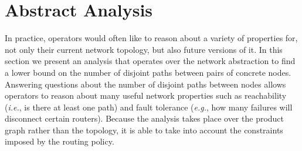 \documentclass[numbers, 10pt, preprint]{sigplanconf}
\newcommand{\EG}{\emph{e.g.}}
\newcommand{\IE}{\emph{i.e.}}
\begin{document}
%
%
%
%


\section{Abstract Analysis}
\label{sec:analysis}

In practice, operators would often like to reason about a variety of properties for, not only their current network topology, but also future versions of it.
In this section we present an analysis that operates over the network abstraction to find a lower bound on the number of disjoint paths between pairs of concrete nodes. Answering questions about the number of disjoint paths between nodes allows operators to reason about many useful network properties such as reachability (\IE, is there at least one path) and fault tolerance (\EG, how many failures will disconnect certain routers). Because the analysis takes place over the product graph rather than the topology, it is able to take into account the constraints imposed by the routing policy.


\newcommand{\inference}[7]{
    \node[draw, anchor=west] at (#1 + .5, 2.5 / 2) {#3};
    \node[] at (#1, 2.5 / 2 + 2.5) {\textbf{#5}};
    \node at (#1 + .34, .6 + .2) {#6};
    \node at (#1 + .34, 1.9 - .2) {#7};
    \node at (#1, -.6) {#2};
    \node at (#1, 2.5 + .4 + .2) {#4};
    \draw [] (#1, 2.5 - .2) circle [radius=0.4] node {$n$};
    \draw [] (#1, .2) circle [radius=0.4] node {$m$};
    \draw [->] (#1, .4 + .2) -- (#1, 2.5 - .4 - .2);
}

\newcommand{\inferencenobox}[7]{
    \node[anchor=west] at (#1 + .1, 1.25) {#3};
    \node[] at (#1, 2.5 / 2 + 2.5) {\textbf{#5}};
    \node at (#1 + .34, .6) {#6};
    \node at (#1 + .34, 1.9) {#7};
    \node at (#1, -.6) {#2};
    \node at (#1, 2.5 + .4 + .2) {#4};
    \draw [] (#1, 2.5 - .2) circle [radius=0.4] node {$n$};
    \draw [] (#1, .2) circle [radius=0.4] node {$m$};
    \draw [->] (#1, .2 + .4) -- (#1, 2.5 - .4 - .2);
}

\newcommand{\inferencetwo}[1]{
    \node[draw, anchor=west] at (#1 + 2, 1.25) {$e_i > 0$};
    \node[] at (#1 + .46, 1.25 + 2.5) {\textbf{I-striping}};
    \node at (#1 - 1 - .11, .6) {$e_1$};
    \node at (#1 + .11, 1.5) {$e_2$};
    \node at (#1 + 2 + .11, .6) {$e_3$};
    \node at (#1 + .11 + .8, 1.5) {$e_4$};
    \node at (#1 - 1, -.8) {L$_m(j,k)$};
    \node at (#1 +. 5, 2.9) {S$_n(min(j*k,g),1)$};
    \node at (#1 + 2, -.8) {S$_o\big( min(j, g *\frac{e_4}{e_3}),1\big)$};
    \node at (#1, 3.3) {};
    \draw [] (#1 + .5, 2.01) circle [radius=0.4] node {$n$};
    \draw [] (#1 - 1, 0) circle [radius=0.4] node {$m$};
    \draw [] (#1 + 2, 0) circle [radius=0.4] node {$o$};
    \draw [->] (#1 - 1, .4) -- (#1 + .5, 2 - .4);
    \draw [<-] (#1 + 2, .4) -- (#1 + .5, 2 - .4);
}
\end{document}

